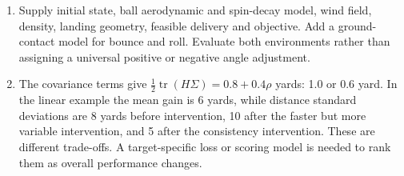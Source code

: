 \begin{enumerate}[leftmargin=*]
\item Supply initial state, ball aerodynamic and spin-decay model, wind
field, density, landing geometry, feasible delivery and objective. Add a
ground-contact model for bounce and roll. Evaluate both environments rather
than assigning a universal positive or negative angle adjustment.

\item The covariance terms give
$\tfrac12\operatorname{tr}(H\Sigma)=0.8+0.4\rho$ yards: 1.0 or 0.6 yard.
In the linear example the mean gain is 6 yards, while distance standard
deviations are 8 yards before intervention, 10 after the faster but more
variable intervention, and 5 after the consistency intervention. These
are different trade-offs. A target-specific loss or scoring model is needed
to rank them as overall performance changes.
\end{enumerate}
